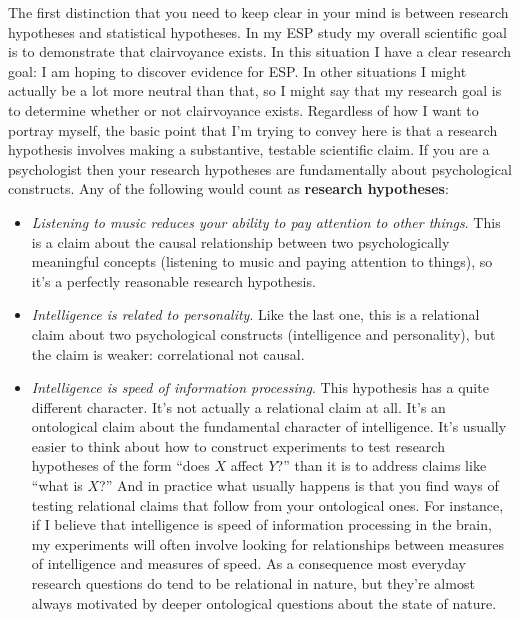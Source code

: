 \documentclass[
  a4paper,
]{book}
\providecommand{\tightlist}{%
  \setlength{\itemsep}{0pt}\setlength{\parskip}{0pt}}\usepackage{longtable,booktabs,array}
\begin{document}
The first distinction that you need to keep clear in your mind is
between research hypotheses and statistical hypotheses. In my ESP study
my overall scientific goal is to demonstrate that clairvoyance exists.
In this situation I have a clear research goal: I am hoping to discover
evidence for ESP. In other situations I might actually be a lot more
neutral than that, so I might say that my research goal is to determine
whether or not clairvoyance exists. Regardless of how I want to portray
myself, the basic point that I'm trying to convey here is that a
research hypothesis involves making a substantive, testable scientific
claim. If you are a psychologist then your research hypotheses are
fundamentally about psychological constructs. Any of the following would
count as \textbf{research hypotheses}:

\begin{itemize}
\tightlist
\item
  \emph{Listening to music reduces your ability to pay attention to
  other things}. This is a claim about the causal relationship between
  two psychologically meaningful concepts (listening to music and paying
  attention to things), so it's a perfectly reasonable research
  hypothesis.
\item
  \emph{Intelligence is related to personality}. Like the last one, this
  is a relational claim about two psychological constructs (intelligence
  and personality), but the claim is weaker: correlational not causal.
\item
  \emph{Intelligence is speed of information processing}. This
  hypothesis has a quite different character. It's not actually a
  relational claim at all. It's an ontological claim about the
  fundamental character of intelligence. It's usually easier to think
  about how to construct experiments to test research hypotheses of the
  form ``does \(X\) affect \(Y\)?'' than it is to address claims like
  ``what is \(X\)?'' And in practice what usually happens is that you
  find ways of testing relational claims that follow from your
  ontological ones. For instance, if I believe that intelligence is
  speed of information processing in the brain, my experiments will
  often involve looking for relationships between measures of
  intelligence and measures of speed. As a consequence most everyday
  research questions do tend to be relational in nature, but they're
  almost always motivated by deeper ontological questions about the
  state of nature.
\end{itemize}
\end{document}

